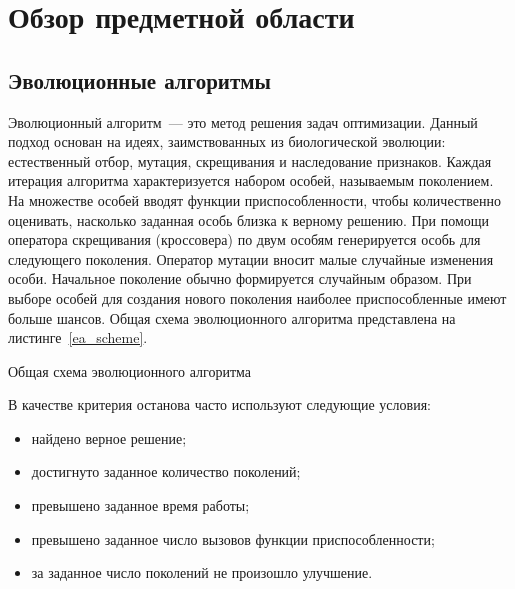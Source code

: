 \chapter{Обзор предметной области}
\label{chapter_review}

\section{Эволюционные алгоритмы}
Эволюционный алгоритм~--- это метод решения задач оптимизации. Данный подход основан на идеях, заимствованных из биологической эволюции: естественный отбор, мутация, скрещивания и наследование признаков. Каждая итерация алгоритма характеризуется набором особей, называемым поколением. На множестве особей вводят функции приспособленности, чтобы количественно оценивать, насколько заданная особь близка к верному решению. При помощи оператора скрещивания (кроссовера) по двум особям генерируется особь для следующего поколения. Оператор мутации вносит малые случайные изменения особи. Начальное поколение обычно формируется случайным образом. При выборе особей для создания нового поколения наиболее приспособленные имеют больше шансов. Общая схема эволюционного алгоритма представлена на листинге~\ref{ea_scheme}.

\begin{algorithm}[h!]
\caption{Общая схема эволюционного алгоритма}
\label{ea_scheme}
\begin{algorithmic}[1]
  \ENDWHILE  
\end{algorithmic}
\end{algorithm}

В качестве критерия останова часто используют следующие условия:
\begin{itemize}
 \item найдено верное решение;
 \item достигнуто заданное количество поколений;
 \item превышено заданное время работы;
 \item превышено заданное число вызовов функции приспособленности;
 \item за заданное число поколений не произошло улучшение.
\end{itemize}

